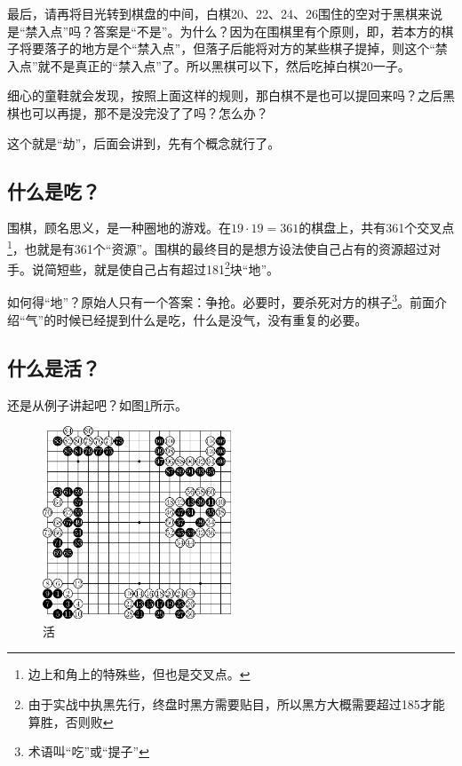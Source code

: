 \documentclass[12pt，a4paper, titlepage]{article}
\begin{document}
最后，请再将目光转到棋盘的中间，白棋20、22、24、26围住的空对于黑棋来说是“禁入点”吗？答案是“不是”。为什么？因为在围棋里有个原则，即，若本方的棋子将要落子的地方是个“禁入点”，但落子后能将对方的某些棋子提掉，则这个“禁入点”就不是真正的“禁入点”了。所以黑棋可以下，然后吃掉白棋20一子。

细心的童鞋就会发现，按照上面这样的规则，那白棋不是也可以提回来吗？之后黑棋也可以再提，那不是没完没了了吗？怎么办？

这个就是“劫”，后面会讲到，先有个概念就行了。

\subsection{什么是吃？}
围棋，顾名思义，是一种圈地的游戏。在$19 \cdot 19=361$的棋盘上，共有361个交叉点\footnote{边上和角上的特殊些，但也是交叉点。}，也就是有361个“资源”。围棋的最终目的是想方设法使自己占有的资源超过对手。说简短些，就是使自己占有超过181\footnote{由于实战中执黑先行，终盘时黑方需要贴目，所以黑方大概需要超过185才能算胜，否则败}块“地”。

如何得“地”？原始人只有一个答案：争抢。必要时，要杀死对方的棋子\footnote{术语叫“吃”或“提子”}。前面介绍“气”的时候已经提到什么是吃，什么是没气，没有重复的必要。

\subsection{什么是活？}
还是从例子讲起吧？如图\ref{fig:huo}所示。
\begin{figure}[htbp]   %
	\setlength{\abovecaptionskip}{4pt}    
	\setlength{\belowcaptionskip}{4pt}
	\centering  %
	\includegraphics[width=0.5\textwidth]{fig/huo.eps}
	\caption{活}
	\label{fig:huo}
\end{figure}
\end{document}
